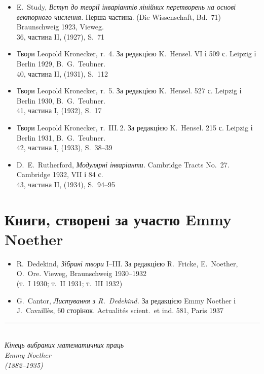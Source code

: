 \documentclass[11pt]{article}
\newcommand{\foreign}[1]{#1}
\begin{document}
\begin{itemize}[leftmargin=1.5em,itemsep=0.2em]
\item E.\ Study, \textit{Вступ до теорії інваріантів лінійних перетворень на основі векторного числення.} Перша частина. (\foreign{Die Wissenschaft}, Bd.~71) Braunschweig 1923, Vieweg.\\
36, частина II, (1927), S.~71

\item Твори Leopold Kronecker, т.~4. За редакцією K.\ Hensel. VI і 509 с. Leipzig і Berlin 1929, B.\ G.\ Teubner.\\
40, частина II, (1931), S.~112

\item Твори Leopold Kronecker, т.~5. За редакцією K.\ Hensel. 527 с. Leipzig і Berlin 1930, B.\ G.\ Teubner.\\
41, частина I, (1932), S.~17

\item Твори Leopold Kronecker, т.~III.\,2. За редакцією K.\ Hensel. 215 с. Leipzig і Berlin 1931, B.\ G.\ Teubner.\\
42, частина I, (1933), S.~38--39

\item D.\ E.\ Rutherford, \textit{Модулярні інваріанти.} \foreign{Cambridge Tracts No.~27.} Cambridge 1932, VII і 84 с.\\
43, частина II, (1934), S.~94--95
\end{itemize}

\newpage
\section*{Книги, створені за участю Emmy Noether}

\begin{itemize}[leftmargin=1.5em,itemsep=0.5em]
\item R.\ Dedekind, \textit{Зібрані твори} I--III. За редакцією R.\ Fricke, E.\ Noether, O.\ Ore. Vieweg, Braunschweig 1930--1932\\
(т.~I 1930; т.~II 1931; т.~III 1932)

\item G.\ Cantor, \textit{Листування з R.\ Dedekind.} За редакцією Emmy Noether і J.\ Cavaillès, 60 сторінок. \foreign{Actualités scient.\ et ind.} 581, Paris 1937
\end{itemize}

\vfill

\begin{center}
\rule{0.5\textwidth}{0.4pt}\\[1em]
\textit{Кінець вибраних математичних праць}\\[0.5em]
\textit{Emmy Noether}\\[0.5em]
\textit{(1882--1935)}
\end{center}
\end{document}
